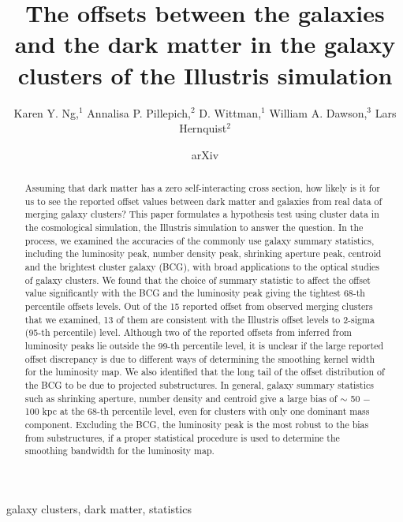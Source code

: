 \documentclass[usenatbib]{mn2e}
\title[
	The offsets between the galaxies and the dark matter in the galaxy clusters of the Illustris simulation]
{The offsets between the galaxies and the dark matter	in the galaxy clusters of
the Illustris simulation}
\author[Karen Y. Ng et al.]{Karen Y. Ng,$^{1}$
	Annalisa P. Pillepich,$^{2}$ 
	D. Wittman,$^{1}$
	William A. Dawson,$^{3}$ 
	\newauthor Lars Hernquist$^{2}$
}
\begin{document}
\date{arXiv} \pagerange{\pageref{firstpage}--\pageref{lastpage}}
 \maketitle\label{firstpage}
\begin{abstract} 
	Assuming that dark matter has a zero self-interacting cross section, how likely is
	it for us to see the reported offset values between dark matter and galaxies 
	from real data of merging galaxy clusters? 
	This paper formulates a hypothesis test using cluster data in the cosmological 
	simulation, the Illustris simulation to answer the question. 
	In the process,
	we examined the accuracies of the commonly use galaxy summary 
	statistics, including the
	luminosity peak, number density peak, shrinking aperture peak, centroid and
	the brightest cluster galaxy (BCG), with broad applications to the optical studies of
	galaxy clusters. 	
	We found that the choice of summary statistic to affect the offset
	value significantly with the BCG and the luminosity peak giving the tightest
	68-th percentile offsets levels.  
	Out of the 15 reported offset from observed merging clusters
	that we examined, 13 of
	them are consistent with the Illustris offset levels to 2-sigma 
	(95-th percentile) level. Although two of the reported offsets from inferred
	from luminosity peaks lie outside the 99-th percentile level, it is unclear
	if the large reported offset discrepancy is due to different ways of
	determining the smoothing kernel width for the luminosity map. 
	We also identified that the long
	tail of the offset distribution of the BCG to be due to projected 
	substructures. In general, galaxy summary statistics such as
	shrinking aperture, number density and centroid give a large bias of $\sim$ 50
	$-$ 100 kpc at
	the 68-th percentile level, even for clusters with only one dominant 
	mass component. Excluding the BCG, 
	the luminosity peak is the most 
	robust to the bias from substructures, 
	if a proper statistical procedure is used to determine
	the smoothing bandwidth for the luminosity map.
\end{abstract}

\begin{keywords}
	galaxy clusters, dark matter, statistics 
\end{keywords}





\appendix


\clearpage\bsp\label{lastpage} 
\end{document}
